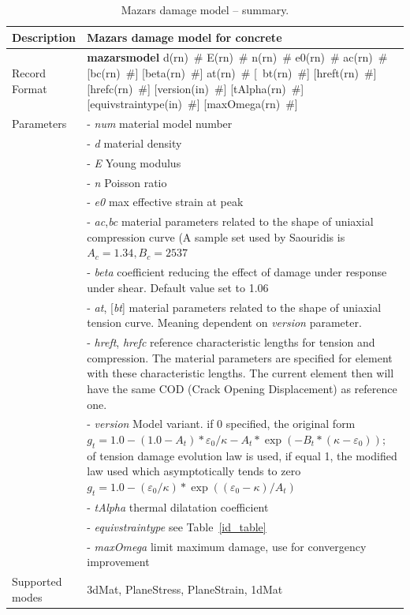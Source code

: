 \documentclass[a4paper]{article}
\newcommand{\descitem}[1]{{\noindent \bf #1}}
\newcommand{\elemparam}[2]{{{#1\tiny (#2)}~\#}}
\newcommand{\optelemparam}[2]{[{~\elemparam{#1}{#2}}]}
\newcommand{\param}[1]{{\it #1}}
\newcommand{\optparam}[1]{[{\it #1}]}
\begin{document}
\begin{table}[!htb]
\begin{tabular}{|l|p{9cm}|}
\hline
Description & Mazars damage model for concrete\\
\hline
Record Format & \descitem{mazarsmodel} \elemparam{d}{rn} \elemparam{E}{rn}
\elemparam{n}{rn}  \elemparam{e0}{rn}
\elemparam{ac}{rn} [\elemparam{bc}{rn}] [\elemparam{beta}{rn}]
\elemparam{at}{rn} \optelemparam{bt}{rn}
[\elemparam{hreft}{rn}] [\elemparam{hrefc}{rn}]
[\elemparam{version}{in}] [\elemparam{tAlpha}{rn}] [\elemparam{equivstraintype}{in}]
[\elemparam{maxOmega}{rn}]\\
Parameters &- \param{num} material model number\\
&- \param{d} material density\\
&- \param{E} Young modulus\\
&- \param{n} Poisson ratio\\
&- \param{e0} max effective strain at peak\\
&- \param{ac},\param{bc} material parameters related to the shape of
uniaxial compression curve (A sample set used by Saouridis is $A_c =
1.34, B_c = 2537$\\
&- \param{beta} coefficient reducing the effect of damage under
response under shear. Default value set to 1.06\\
&- \param{at}, \optparam{bt} material parameters related to the shape of
uniaxial tension curve. Meaning dependent on \param{version}
parameter.\\
&- \param{hreft}, \param{hrefc} reference characteristic lengths for
tension and compression. The material parameters are specified for
element with these characteristic lengths. The current element then
will have the same COD (Crack Opening Displacement) as reference one.\\
&- \param{version} Model variant. if 0 specified, the original form
$g_t= 1.0-(1.0-A_t)*\varepsilon_0/\kappa - A_t*\exp(-B_t*(\kappa-\varepsilon_0));
$ of
tension damage evolution law is used, if equal 1, the modified law
used which asymptotically tends to zero
$g_t = 1.0-(\varepsilon_0/\kappa)*\exp((\varepsilon_0-\kappa)/A_t)$\\
&- \param{tAlpha} thermal dilatation coefficient\\
&- \param{equivstraintype} see Table~\ref{id_table}\\
&- \param{maxOmega} limit maximum damage, use for convergency improvement\\
Supported modes& 3dMat, PlaneStress, PlaneStrain, 1dMat\\
\hline
\end{tabular}
\caption{Mazars damage model  -- summary.}
\label{maz_table}
\end{table}
\end{document}
